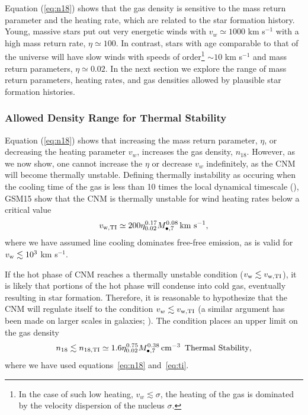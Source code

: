 \documentclass[usenatbib,fleqn]{mnras}
\newcommand{\Mbh}[1][]{M_{\bullet#1}}
\begin{document}
Equation (\ref{eq:n18}) shows that the gas density is sensitive to the
mass return parameter and the heating rate, which are related to the
star formation history. Young, massive stars put out very energetic
winds with $v_w\simeq 1000$ km s$^{-1}$ with a high mass return rate,
$\eta\simeq 100$.  In contrast, stars with age comparable to that of
the universe will have slow winds with speeds of order\footnote{In the
  case of such low heating, $v_w \lesssim \sigma$, the heating of the
  gas is dominated by the velocity dispersion of the nucleus
  $\sigma$.} $\sim 10$ km s$^{-1}$ and mass return parameters,
$\eta\simeq0.02$. In the next section we explore the range of mass
return parameters, heating rates, and gas densities allowed by
plausible star formation histories.

\subsubsection{Allowed Density Range for Thermal Stability}

Equation (\ref{eq:n18}) shows that increasing the mass return
parameter, $\eta$, or decreasing the heating parameter $v_w$,
increases the gas density, $n_{18}$.  However, as we now show, one
cannot increase the $\eta$ or decrease $v_w$ indefinitely, as the CNM
will become thermally unstable.  Defining thermally instability as
occuring when the cooling time of the gas is less than 10 times the
local dynamical timescale (\citealt{McCourt+2012}), GSM15 show that the
CNM is thermally unstable for wind heating rates below a critical
value
\begin{equation}
v_{\rm w,TI}\simeq 200 \eta_{0.02}^{0.17} \Mbh[,7]^{0.08} \,{\rm km \,\,s^{-1}},
\label{eq:ti}
\end{equation}
where we have assumed line cooling dominates free-free emission, as is valid for $v_{\rm w} \lesssim 10^{3}$ km s$^{-1}$.

If the hot phase of CNM reaches a thermally unstable condition
($v_{\rm w} \lesssim v_{\rm w,TI}$), it is likely that portions of the
hot phase will condense into cold gas, eventually resulting in star
formation.  Therefore, it is reasonable to hypothesize that the CNM
will regulate itself to the condition $v_w \lesssim v_{\rm w,TI}$ (a
similar argument has been made on larger scales in galaxies;
\citealt{Voit+2015}).  The condition places an upper limit on the gas
density
\begin{equation}
n_{18} \lesssim n_{\rm 18,TI}\simeq 1.6 \eta_{0.02}^{0.75} \Mbh[,7]^{0.38} \, {\rm cm^{-3}}\,\,\,\text{Thermal Stability}
\label{eq:n18ti},
\end{equation}
where we have used equations~\eqref{eq:n18} and~\eqref{eq:ti}.
\end{document}
